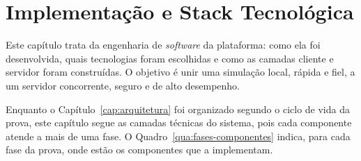 \chapter{Implementação e Stack Tecnológica}
\label{cap:implementacao}

Este capítulo trata da engenharia de \textit{software} da plataforma: como ela foi desenvolvida, quais tecnologias foram escolhidas e como as camadas cliente e servidor foram construídas. O objetivo é unir uma simulação local, rápida e fiel, a um servidor concorrente, seguro e de alto desempenho.

Enquanto o Capítulo~\ref{cap:arquitetura} foi organizado segundo o ciclo de vida da prova, este capítulo segue as camadas técnicas do sistema, pois cada componente atende a mais de uma fase. O Quadro~\ref{qua:fases-componentes} indica, para cada fase da prova, onde estão os componentes que a implementam.

